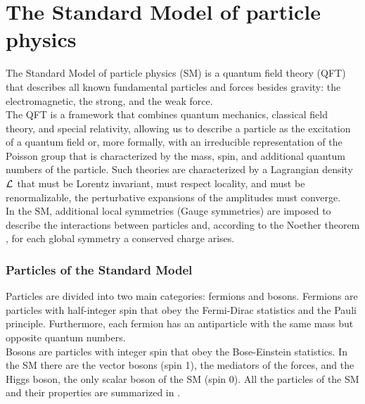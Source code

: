 \label{sec:TH}
\vspace{-1cm}
\minitoc

\section{The Standard Model of particle physics}

The Standard Model of particle physics (SM) is a quantum field theory (QFT) that describes all known fundamental particles and forces besides gravity: the electromagnetic, the strong, and the weak force. \\
The QFT is a framework that combines quantum mechanics, classical field theory, and special relativity, allowing us to describe a particle as the excitation of a quantum field or, more formally, with an irreducible representation of the Poisson group that is characterized by the mass, spin, and additional quantum numbers of the particle.
Such theories are characterized by a Lagrangian density $\mathcal{L}_\text{}$ that must be Lorentz invariant, must respect locality, and must be renormalizable, \ie the perturbative expansions of the amplitudes must converge. \\
In the SM, additional local symmetries (Gauge symmetries) are imposed to describe the interactions between particles and, according to the Noether theorem \cite{NoetherInvarianteVariationsprobleme}, for each global symmetry a conserved charge arises.

\subsubsection*{Particles of the Standard Model}
Particles are divided into two main categories: fermions and bosons. 
Fermions are particles with half-integer spin that obey the Fermi-Dirac statistics and the Pauli principle. 
Furthermore, each fermion has an antiparticle with the same mass but opposite quantum numbers.\\
Bosons are particles with integer spin that obey the Bose-Einstein statistics. In the SM there are the vector bosons (spin 1), the mediators of the forces, and the Higgs boson, the only scalar boson of the SM (spin 0). All the particles of the SM and their properties are summarized in .



